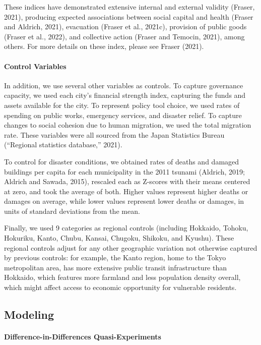 \documentclass[]{elsarticle} %
\begin{document}
These indices have demonstrated extensive internal and external validity
(Fraser, 2021), producing expected associations between social capital
and health (Fraser and Aldrich, 2021), evacuation (Fraser et al.,
2021c), provision of public goods (Fraser et al., 2022), and collective
action (Fraser and Temocin, 2021), among others. For more details on
these index, please see Fraser (2021).

\hypertarget{control-variables}{%
\paragraph{Control Variables}\label{control-variables}}

In addition, we use several other variables as controls. To capture
governance capacity, we used each city's financial strength index,
capturing the funds and assets available for the city. To represent
policy tool choice, we used rates of spending on public works, emergency
services, and disaster relief. To capture changes to social cohesion due
to human migration, we used the total migration rate. These variables
were all sourced from the Japan Statistics Bureau ({``Regional
statistics database,''} 2021).

To control for disaster conditions, we obtained rates of deaths and
damaged buildings per capita for each municipality in the 2011 tsunami
(Aldrich, 2019; Aldrich and Sawada, 2015), rescaled each as Z-scores
with their means centered at zero, and took the average of both. Higher
values represent higher deaths or damages on average, while lower values
represent lower deaths or damages, in units of standard deviations from
the mean.

Finally, we used 9 categories as regional controls (including Hokkaido,
Tohoku, Hokuriku, Kanto, Chubu, Kansai, Chugoku, Shikoku, and Kyushu).
These regional controls adjust for any other geographic variation not
otherwise captured by previous controls: for example, the Kanto region,
home to the Tokyo metropolitan area, has more extensive public transit
infrastructure than Hokkaido, which features more farmland and less
population density overall, which might affect access to economic
opportunity for vulnerable residents.

\hypertarget{modeling}{%
\subsection{Modeling}\label{modeling}}

\hypertarget{difference-in-differences-quasi-experiments}{%
\paragraph{Difference-in-Differences
Quasi-Experiments}\label{difference-in-differences-quasi-experiments}}
\end{document}
